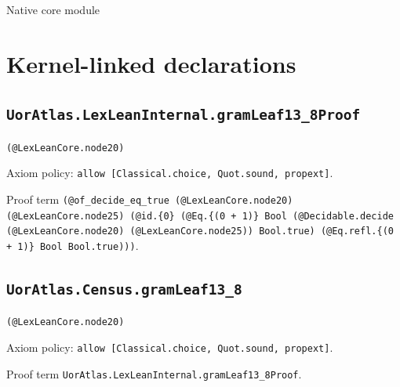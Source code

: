 \documentclass[11pt]{article}
\begin{document}
\begin{center}{\LARGE Native core module}\end{center}
\section*{Kernel-linked declarations}
\subsection*{\texttt{UorAtlas.LexLeanInternal.gramLeaf13\_8Proof}}
\noindent\texttt{(@LexLeanCore.node20)}\par
\noindent Axiom policy: \texttt{allow [Classical.choice, Quot.sound, propext]}.\par
\noindent Proof term \texttt{(@of\_decide\_eq\_true (@LexLeanCore.node20) (@LexLeanCore.node25) (@id.\{0\} (@Eq.\{(0 + 1)\} Bool (@Decidable.decide (@LexLeanCore.node20) (@LexLeanCore.node25)) Bool.true) (@Eq.refl.\{(0 + 1)\} Bool Bool.true)))}.\par
\subsection*{\texttt{UorAtlas.Census.gramLeaf13\_8}}
\noindent\texttt{(@LexLeanCore.node20)}\par
\noindent Axiom policy: \texttt{allow [Classical.choice, Quot.sound, propext]}.\par
\noindent Proof term \texttt{UorAtlas.LexLeanInternal.gramLeaf13\_8Proof}.\par
\end{document}
